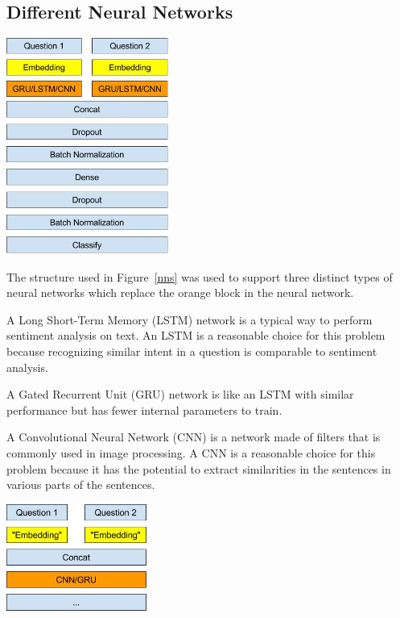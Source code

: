 \documentclass{article}
\begin{document}
\subsection{Different Neural Networks}

\begin{center}
  \includegraphics[width=0.4\textwidth]{NeuralNetStructure}
  \label{nns}
\end{center}

The structure used in Figure~\ref{nns} was used to support three distinct types of neural networks which replace the orange block in the neural network.

A Long Short-Term Memory (LSTM) network is a typical way to perform sentiment analysis on text. An LSTM is a reasonable choice for this problem because recognizing similar intent in a question is comparable to sentiment analysis.

A Gated Recurrent Unit (GRU) network is like an LSTM with similar performance but has fewer internal parameters to train.

A Convolutional Neural Network (CNN) is a network made of filters that is commonly used in image processing. A CNN is a reasonable choice for this problem because it has the potential to extract similarities in the sentences in various parts of the sentences.

\begin{center}
  \includegraphics[width=0.35\textwidth]{LetterNeuralNetStructure}
  \label{lnns}
\end{center}
\end{document}
